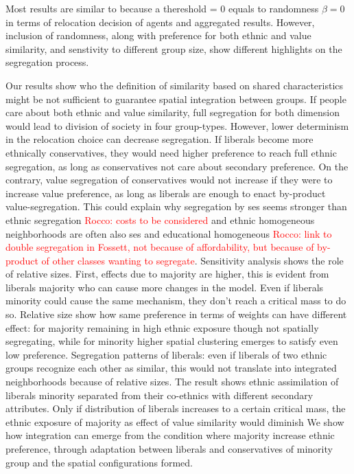 \documentclass[
]{article}
\begin{document}
Most results are similar to \cite{paolillo2018} because a thereshold = 0
equals to randomness \(\beta = 0\) in terms of relocation decision of
agents and aggregated results. However, inclusion of randomness, along
with preference for both ethnic and value similarity, and senstivity to
different group size, show different highlights on the segregation
process.

Our results show who the definition of similarity based on shared
characteristics might be not sufficient to guarantee spatial integration
between groups. If people care about both ethnic and value similarity,
full segregation for both dimension would lead to division of society in
four group-types. However, lower determinism in the relocation choice
can decrease segregation. If liberals become more ethnically
conservatives, they would need higher preference to reach full ethnic
segregation, as long as conservatives not care about secondary
preference. On the contrary, value segregation of conservatives would
not increase if they were to increase value preference, as long as
liberals are enough to enact by-product value-segregation. This could
explain why segregation by ses seems stronger than ethnic segregation
{\textcolor{red}{Rocco: costs to be considered}} and ethnic homogeneous
neighborhoods are often also ses and educational homogeneous
{\textcolor{red}{Rocco: link to double segregation in Fossett, not because of affordability, but because of by-product of other classes wanting to segregate}}.
Sensitivity analysis shows the role of relative sizes. First, effects
due to majority are higher, this is evident from liberals majority who
can cause more changes in the model. Even if liberals minority could
cause the same mechanism, they don't reach a critical mass to do so.
Relative size show how same preference in terms of weights can have
different effect: for majority remaining in high ethnic exposure though
not spatially segregating, while for minority higher spatial clustering
emerges to satisfy even low preference. Segregation patterns of
liberals: even if liberals of two ethnic groups recognize each other as
similar, this would not translate into integrated neighborhoods because
of relative sizes. The result shows ethnic assimilation of liberals
minority separated from their co-ethnics with different secondary
attributes. Only if distribution of liberals increases to a certain
critical mass, the ethnic exposure of majority as effect of value
similarity would diminish We show how integration can emerge from the
condition where majority increase ethnic preference, through adaptation
between liberals and conservatives of minority group and the spatial
configurations formed.
\end{document}
